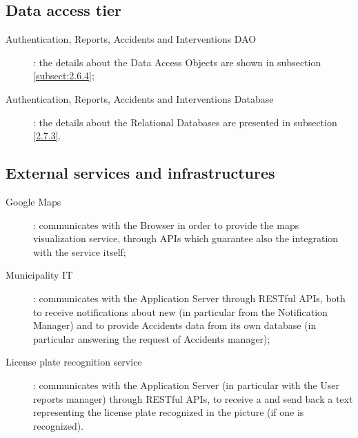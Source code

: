 \documentclass[../../DD.tex]{subfiles}
\begin{document}
\subsection{Data access tier\label{sect:2.2.4}}
	\begin{description}
	\item[Authentication, Reports, Accidents and Interventions DAO]: the details about the Data Access Objects are shown in subsection \ref{subsect:2.6.4};
	\item[Authentication, Reports, Accidents and Interventions Database]: the details about the Relational Databases are presented in subsection \ref{2.7.3}.
	\end{description}
	
\subsection{External services and infrastructures\label{sect:2.2.5}}
	\begin{description}
	\item[Google Maps]: communicates with the Browser in order to provide the maps visualization service, through APIs which guarantee also the integration with the service itself;
	
	\item[Municipality IT]: communicates with the Application Server through RESTful APIs, both to receive notifications about new  (in particular from the Notification Manager) and to provide Accidents data from its own database (in particular answering the request of Accidents manager);
	
	\item[License plate recognition service]: communicates with the Application Server (in particular with the User reports manager) through RESTful APIs, to receive a  and send back a text representing the license plate recognized in the picture (if one is recognized). 
	\end{description}

\newpage
\end{document}
